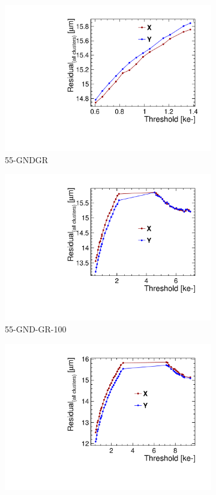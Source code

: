 \begin{figure}[htbp]
  \begin{subfigure}[b]{0.33\textwidth}
    \includegraphics[width=\textwidth]{./figures/TestBeam/residuals_W0019_C07_THLscan.pdf}
    \caption{55-GNDGR}
  \end{subfigure} \hfill
  \begin{subfigure}[b]{0.33\textwidth}
    \includegraphics[width=\textwidth]{./figures/TestBeam/residuals_W0005_E02_THLscan.pdf}
    \caption{55-GND-GR-100}
  \end{subfigure}\hfill
  \begin{subfigure}[b]{0.33\textwidth}
    \includegraphics[width=\textwidth]{./figures/TestBeam/residuals_W0005_F01_THLscan.pdf}

\end{subfigure}
\end{figure}
